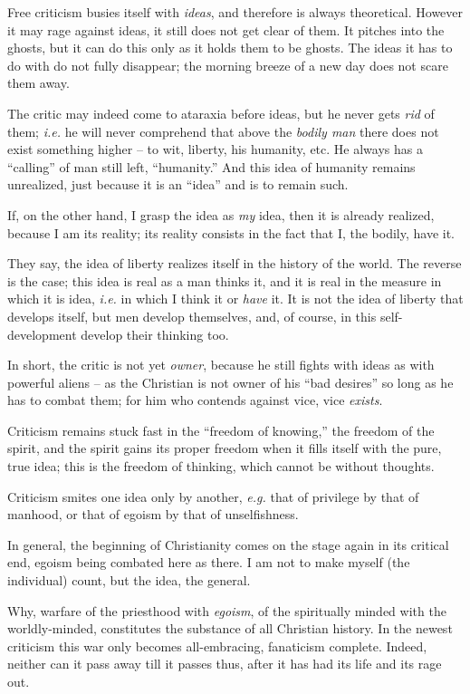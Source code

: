 Free criticism busies itself with \textit{ideas}, and therefore is always 
theoretical. However it may rage against ideas, it still does not get clear of 
them. It pitches into the ghosts, but it can do this only as it holds them to 
be ghosts. The ideas it has to do with do not fully disappear; the morning 
breeze of a new day does not scare them away.

The critic may indeed come to ataraxia before ideas, but he never gets 
\textit{rid} of them; \textit{i.e.} he will never comprehend that above the 
\textit{bodily man} there does not exist something higher -- to wit, liberty, 
his humanity, etc. He always has a ``calling'' of man still left, 
``humanity.'' And this idea of humanity remains unrealized, just because it 
is an ``idea'' and is to remain such.

If, on the other hand, I grasp the idea as \textit{my} idea, then it is 
already realized, because I am its reality; its reality consists in the fact 
that I, the bodily, have it.

They say, the idea of liberty realizes itself in the history of the world. The 
reverse is the case; this idea is real as a man thinks it, and it is real in 
the measure in which it is idea, \textit{i.e.} in which I think it or 
\textit{have} it. It is not the idea of liberty that develops itself, but men 
develop themselves, and, of course, in this self-development develop their 
thinking too.

In short, the critic is not yet \textit{owner}, because he still fights with 
ideas as with powerful aliens -- as the Christian is not owner of his ``bad 
desires'' so long as he has to combat them; for him who contends against 
vice, vice \textit{exists}.

Criticism remains stuck fast in the ``freedom of knowing,'' the freedom of 
the spirit, and the spirit gains its proper freedom when it fills itself with 
the pure, true idea; this is the freedom of thinking, which cannot be without 
thoughts.

Criticism smites one idea only by another, \textit{e.g.} that of privilege by 
that of manhood, or that of egoism by that of unselfishness.

In general, the beginning of Christianity comes on the stage again in its 
critical end, egoism being combated here as there. I am not to make myself 
(the individual) count, but the idea, the general.

Why, warfare of the priesthood with \textit{egoism}, of the spiritually minded 
with the worldly-minded, constitutes the substance of all Christian history. 
In the newest criticism this war only becomes all-embracing, fanaticism 
complete. Indeed, neither can it pass away till it passes thus, after it has 
had its life and its rage out.

